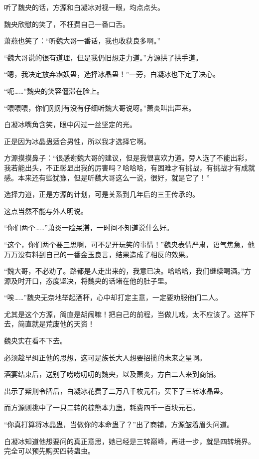 \begin{this_body}
听了魏央的话，方源和白凝冰对视一眼，均点点头。

魏央欣慰的笑了，不枉费自己一番口舌。

萧燕也笑了：“听魏大哥一番话，我也收获良多啊。”

“魏大哥说的很有道理，但是我仍旧想走力道。”方源拱了拱手道。

“嗯，我决定放弃霜妖蛊，选择冰晶蛊！”一旁，白凝冰也下定了决心。

“呃……”魏央的笑容僵滞在脸上。

“喂喂喂，你们刚刚有没有仔细听魏大哥说呀。”萧炎叫出声来。

白凝冰嘴角含笑，眼中闪过一丝坚定的光。

正是因为冰晶蛊适合男性，所以我才选择它啊。

方源摸摸鼻子：“很感谢魏大哥的建议，但是我很喜欢力道。旁人选了不能出彩，我若能出头，不正彰显出我的厉害吗？哈哈哈，有困难才有挑战，有挑战才有成就感。本来还有些犹豫，但是听魏大哥这么一说，很好，就是它了！”

选择力道，正是方源的计划，可是关系到几年后的三王传承的。

这点当然不能与外人明说。

“你们两个……”萧炎一脸呆滞，一时间不知道说什么好。

“这个，你们两个要三思啊，可不是开玩笑的事情！”魏央表情严肃，语气焦急，他万万没有料到自己的一番金玉良言，结果造成了相反的效果。

“魏大哥，不必劝了。路都是人走出来的，我意已决。哈哈哈，我们继续喝酒。”方源及时开口，态度坚决，将魏央的话堵在他的肚子里。

“唉……”魏央无奈地举起酒杯，心中却打定主意，一定要劝服他们二人。

尤其是这个方源，简直是胡闹嘛！把自己的前程，当做儿戏，太不应该了。这样下去，简直就是荒废他的天资！

魏央实在看不下去。

必须趁早纠正他的思想，这可是族长大人想要招揽的未来之星啊。

酒宴结束后，送别了唠唠叨叨的魏央，以及萧炎，方白二人来到商铺。

出示了紫荆令牌后，白凝冰花费了二万八千枚元石，买下了三转冰晶蛊。

而方源则挑中了一只二转的棕熊本力蛊，耗费四千一百块元石。

“你真打算将冰晶蛊，当做你的本命蛊了？”出了商铺，方源皱着眉头问道。

白凝冰知道他想要问的真正意思，她已经是三转巅峰，再进一步，就是四转境界。完全可以预先购买四转蛊虫。


\end{this_body}
